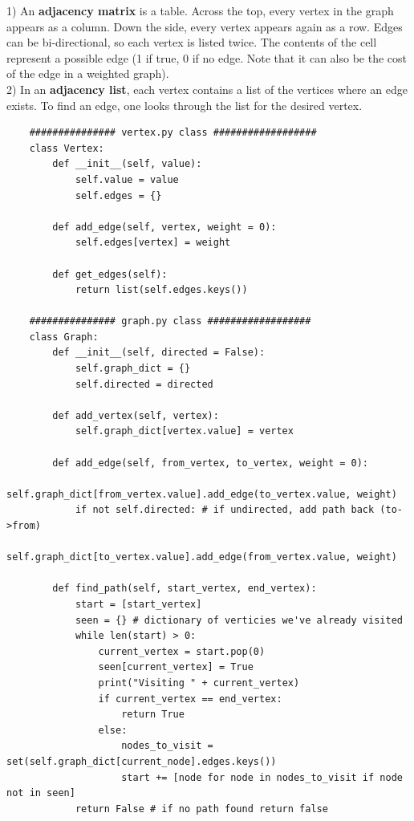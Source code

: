\documentclass[11pt, a4paper]{article}
\begin{document}
\begin{spacing}{1.1}
	1) An \textbf{adjacency matrix} is a table. Across the top, every vertex in the graph appears as a column. Down the side, every vertex appears again as a row. Edges can be bi-directional, so each vertex is listed twice. The contents of the cell represent a possible edge (1 if true, 0 if no edge. Note that it can also be the cost of the edge in a weighted graph). \vspace*{1mm} \\
	2) In an \textbf{adjacency list}, each vertex contains a list of the vertices where an edge exists. To find an edge, one looks through the list for the desired vertex. \newpage
	\begin{lstlisting}
	############### vertex.py class ##################
	class Vertex:
		def __init__(self, value):
			self.value = value
			self.edges = {}
		
		def add_edge(self, vertex, weight = 0):
			self.edges[vertex] = weight
		
		def get_edges(self):
			return list(self.edges.keys())
	
	############### graph.py class ##################
	class Graph:
		def __init__(self, directed = False):
			self.graph_dict = {}
			self.directed = directed
		
		def add_vertex(self, vertex):
			self.graph_dict[vertex.value] = vertex
		
		def add_edge(self, from_vertex, to_vertex, weight = 0):
			self.graph_dict[from_vertex.value].add_edge(to_vertex.value, weight)
			if not self.directed: # if undirected, add path back (to->from)
				self.graph_dict[to_vertex.value].add_edge(from_vertex.value, weight)
		
		def find_path(self, start_vertex, end_vertex):
			start = [start_vertex] 
			seen = {} # dictionary of verticies we've already visited
			while len(start) > 0:
				current_vertex = start.pop(0)
				seen[current_vertex] = True
				print("Visiting " + current_vertex)
				if current_vertex == end_vertex:
					return True
				else:
					nodes_to_visit = set(self.graph_dict[current_node].edges.keys())
					start += [node for node in nodes_to_visit if node not in seen]
			return False # if no path found return false \end{lstlisting} \vspace*{2mm} 

\end{spacing}
\end{document}
